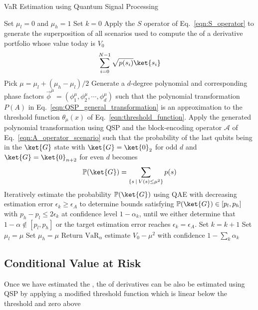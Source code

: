 \begin{enumerate}
\AlgoDontDisplayBlockMarkers\SetAlgoNoEnd\SetAlgoNoLine
\begin{algorithm} 	\label{algo:qsp_var}
\caption{VaR Estimation using Quantum Signal Processing}
\DontPrintSemicolon
{}
Set $\mu_l=0$ and $\mu_h=1$\;
Set $k=0$\;
{
	Apply the $S$ operator of Eq.~\eqref{eqn:S_operator} to generate the superposition of all scenarios used to compute the \var{} of a derivative portfolio whose value today is $V_0$
	\begin{equation*}
		\sum_{i=0}^{N-1}\sqrt{p(s_i)}\ket{s_i}
	\end{equation*}\;
	Pick $\mu = \mu_l + (\mu_h - \mu_l)/2$ \;
	Generate a $d$-degree polynomial and corresponding phase factors $\vec{\phi}^{\mu} = (\phi_1^{\mu}, \phi_2^{\mu}, \cdots, \phi_d^{\mu})$ such that the polynomial transformation $P(A)$ in Eq.~\eqref{eqn:QSP_general_transformation} is an approximation to the threshold function $\theta_{\mu}(x)$ of Eq.~\eqref{eqn:threshold_function}. \;
	Apply the generated polynomial transformation using QSP and the block-encoding operator $\mathcal{A}$ of Eq.~\eqref{eqn:A_operator_scenario} such that the probability of the last qubits being in the $\ket{G}$ state with $\ket{G}=\ket{0}_2$ for odd $d$ and $\ket{G}=\ket{0}_{n+2}$ for even $d$ becomes
	\begin{equation*}
		\mathbb{P}(\ket{G}) = \sum_{ \{s  \: | \: V(s) \le \mu^2\} } p(s)
	\end{equation*}\;
	Iteratively estimate the probability $\mathbb{P}(\ket{G})$ using QAE with decreasing estimation error $\epsilon_k \ge \epsilon_A$  to determine bounds satisfying $\mathbb{P}(\ket{G}) \in [p_l, p_h]$ with $p_h-p_l \le 2\epsilon_k$ at confidence level $1-\alpha_k$, until we either determine that $1 - \alpha \notin [p_l, p_h]$ or the target estimation error reaches $\epsilon_k = \epsilon_A$. \;
	Set $k = k + 1$ \;
		{Set $\mu_l = \mu$}
		{Set $\mu_h = \mu$}
	\Else
		{Return $\textrm{VaR}_{\alpha}$ estimate $V_0-\mu^2$ with confidence $1- \sum_{k}\alpha_k$}
}
\end{algorithm}

\subsection{Conditional Value at Risk}
Once we have estimated the \var{}, the \cvar{} of derivatives can be also be estimated using QSP by applying a modified threshold function which is linear below the threshold and zero above


\end{enumerate}
